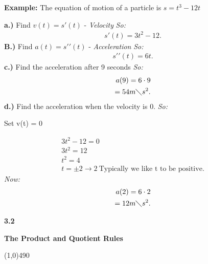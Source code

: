 \documentclass{report}
\begin{document}
  \pagebreak \bigbreak \noindent
  \begin{mdframed}
    \textbf{Example:} The equation of motion of a particle is $s = t^3 -12t$
  \end{mdframed}
  \bigbreak \noindent 
  \textbf{a.)} Find $v(t) = s\prime(t)$ - \textit{Velocity}
  \bigbreak \noindent 
  \textit{So:}
  \begin{align*}
    s\prime(t) = 3t^2 -12
  .\end{align*}
  \bigbreak \noindent 
  \textbf{B.)} Find $a(t) = s\prime\prime(t)$ - \textit{Acceleration}
  \bigbreak \noindent 
  \textit{So:}
  \begin{align*}
    s\prime\prime(t) = 6t 
  .\end{align*}
  \bigbreak \noindent 
  \textbf{c.)} Find the acceleration after 9 seconds
  \bigbreak \noindent 
  \textit{So:}
  \begin{align*}
   a(9) = 6 \cdot 9 \\
  = 54 m \diagdown s^2
  .\end{align*}
  \bigbreak \noindent 
  \textbf{d.)} Find the acceleration when the velocity is 0.
  \bigbreak \noindent 
 \textit{So:} 
 \begin{center}
   Set v(t) = 0 
 \end{center}
 \begin{align*}
   3t^2 -12 = 0 \\ 
   3t^2 = 12 \\ 
   t^2 = 4 \\ 
   t = \pm 2 \rightarrow 2\ \text{Typically we like t to be positive}
 .\end{align*}
 \bigbreak \noindent 
  \textit{Now:}
  \begin{align*}
    a(2) = 6 \cdot 2 \\ 
    = 12 m \diagdown s^2
  .\end{align*}

  \pagebreak \bigbreak \noindent
  \begin{Large}
      \begin{mdframed}
          \begin{center}
              \textbf{3.2}
          \end{center}
      \end{mdframed}
  \end{Large}
  \begin{Large}
      \begin{center}
          \textbf{The Product and Quotient Rules}
      \end{center}
  \end{Large}
  \line(1,0){490}
  
\end{document}
